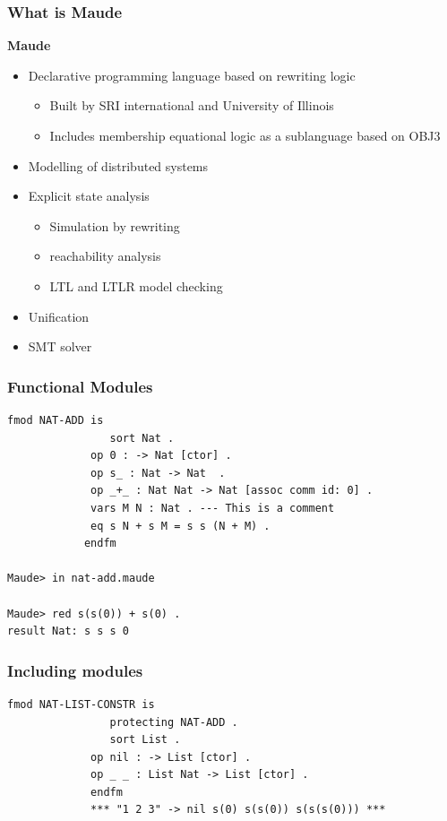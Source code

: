 \documentclass{beamer}
\begin{document}
\begin{frame}
    \frametitle{What is Maude}
    \textbf{Maude}
    \begin{itemize}
        \pause
        \item Declarative programming language based on rewriting logic 
        \begin{itemize}
            \item Built by SRI international and University of Illinois
            \item Includes membership equational logic as a sublanguage based on OBJ3 
        \end{itemize}
        \pause
        \item Modelling of distributed systems 
        \pause 
        \item  Explicit state analysis 
        \begin{itemize}
            \item Simulation by rewriting 
            \item reachability analysis 
            \item LTL and LTLR model checking 
        \end{itemize}
        \pause 
        
        \item Unification 
        \item SMT solver
    \end{itemize}
\end{frame}
\begin{frame}[fragile]
    \frametitle{Functional Modules}
    \begin{lstlisting}[language=maude]
            fmod NAT-ADD is
                sort Nat .
             op 0 : -> Nat [ctor] .
             op s_ : Nat -> Nat  .
             op _+_ : Nat Nat -> Nat [assoc comm id: 0] .
             vars M N : Nat . --- This is a comment
             eq s N + s M = s s (N + M) .
            endfm

Maude> in nat-add.maude 

Maude> red s(s(0)) + s(0) .
result Nat: s s s 0

    \end{lstlisting}
\end{frame}
    \begin{frame}[fragile]
        \frametitle{Including modules}
        \begin{lstlisting}[language=maude]
            fmod NAT-LIST-CONSTR is
                protecting NAT-ADD .
                sort List .
             op nil : -> List [ctor] .
             op _ _ : List Nat -> List [ctor] .
             endfm
             *** "1 2 3" -> nil s(0) s(s(0)) s(s(s(0))) ***
        \end{lstlisting}
        
    \end{frame}
\end{document}
